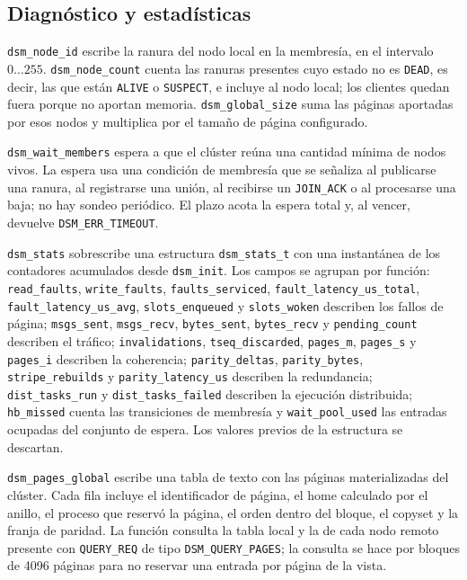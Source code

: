 \subsection{Diagnóstico y estadísticas}

\texttt{dsm\_node\_id} escribe la ranura del nodo local en la membresía, en el intervalo $0 \ldots 255$. \texttt{dsm\_node\_count} cuenta las ranuras presentes cuyo estado no es \texttt{DEAD}, es decir, las que están \texttt{ALIVE} o \texttt{SUSPECT}, e incluye al nodo local; los clientes quedan fuera porque no aportan memoria. \texttt{dsm\_global\_size} suma las páginas aportadas por esos nodos y multiplica por el tamaño de página configurado.

\texttt{dsm\_wait\_members} espera a que el clúster reúna una cantidad mínima de nodos vivos. La espera usa una condición de membresía que se señaliza al publicarse una ranura, al registrarse una unión, al recibirse un \texttt{JOIN\_ACK} o al procesarse una baja; no hay sondeo periódico. El plazo acota la espera total y, al vencer, devuelve \texttt{DSM\_ERR\_TIMEOUT}.

\texttt{dsm\_stats} sobrescribe una estructura \texttt{dsm\_stats\_t} con una instantánea de los contadores acumulados desde \texttt{dsm\_init}. Los campos se agrupan por función: \texttt{read\_faults}, \texttt{write\_faults}, \texttt{faults\_serviced}, \texttt{fault\_latency\_us\_total}, \texttt{fault\_latency\_us\_avg}, \texttt{slots\_enqueued} y \texttt{slots\_woken} describen los fallos de página; \texttt{msgs\_sent}, \texttt{msgs\_recv}, \texttt{bytes\_sent}, \texttt{bytes\_recv} y \texttt{pending\_count} describen el tráfico; \texttt{invalidations}, \texttt{tseq\_discarded}, \texttt{pages\_m}, \texttt{pages\_s} y \texttt{pages\_i} describen la coherencia; \texttt{parity\_deltas}, \texttt{parity\_bytes}, \texttt{stripe\_rebuilds} y \texttt{parity\_latency\_us} describen la redundancia; \texttt{dist\_tasks\_run} y \texttt{dist\_tasks\_failed} describen la ejecución distribuida; \texttt{hb\_missed} cuenta las transiciones de membresía y \texttt{wait\_pool\_used} las entradas ocupadas del conjunto de espera. Los valores previos de la estructura se descartan.

\texttt{dsm\_pages\_global} escribe una tabla de texto con las páginas materializadas del clúster. Cada fila incluye el identificador de página, el home calculado por el anillo, el proceso que reservó la página, el orden dentro del bloque, el copyset y la franja de paridad. La función consulta la tabla local y la de cada nodo remoto presente con \texttt{QUERY\_REQ} de tipo \texttt{DSM\_QUERY\_PAGES}; la consulta se hace por bloques de 4096 páginas para no reservar una entrada por página de la vista.

